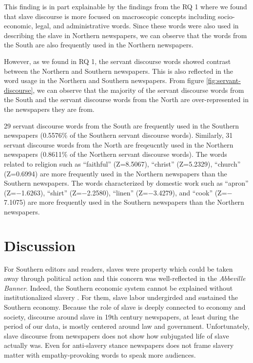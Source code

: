\documentclass[11pt]{article}
\begin{document}
This finding is in part explainable by the findings from the RQ 1 where we found that slave discourse is more focused on macroscopic concepts including socio-economic, legal, and administrative words. 
Since these words were also used in describing the slave in Northern newspapers, we can observe that the words from the South are also frequently used in the Northern newspapers. 

However, as we found in RQ 1, the servant discourse words showed contrast between the Northern and Southern newspapers. 
This is also reflected in the word usage in the Northern and Southern newspapers. 
From figure \ref{fig:servant-discourse}, we can observe that the majority of the servant discourse words from the South and the servant discourse words from the North are over-represented in the newspapers they are from. 

29 servant discourse words from the South are frequently used in the Southern newspapers (0.5576\% of the Southern servant discourse words). 
Similarly, 31 servant discourse words from the North are freqeucntly used in the Northern newspapers (0.8611\% of the Northern servant discourse words).
The words related to religion such as ``faithful'' (Z=8.5067), ``christ'' (Z=5.2329), ``church'' (Z=0.6994) are more frequently used in the Northern newspapers than the Southern newspapers. The words characterized by domestic work such as ``apron'' (Z=$-$1.6263), ``shirt'' (Z=$-$2.2580), ``linen'' (Z=$-$3.4279), and ``cook'' (Z=$-$7.1075) are more frequently used in the Southern newspapers than the Northern newspapers.


\section{Discussion} \label{discussions}
For Southern editors and readers, slaves were property which could be taken away through political action and this concern was well-reflected in the \textit{Abbeville Banner}. 
Indeed, the Southern economic system cannot be explained without institutionalized slavery \citep{meyer_economics_2017}. 
For them, slave labor undergirded and sustained the Southern economy. 
Because the role of slave is deeply connected to economy and society, discourse around slave in 19th century newspapers, at least during the period of our data, is mostly centered around law and government. 
Unfortunately, slave discourse from newspapers does not show how subjugated life of slave actually was. Even for anti-slavery stance newspapers does not frame slavery matter with empathy-provoking words to speak more audiences. 
\end{document}
